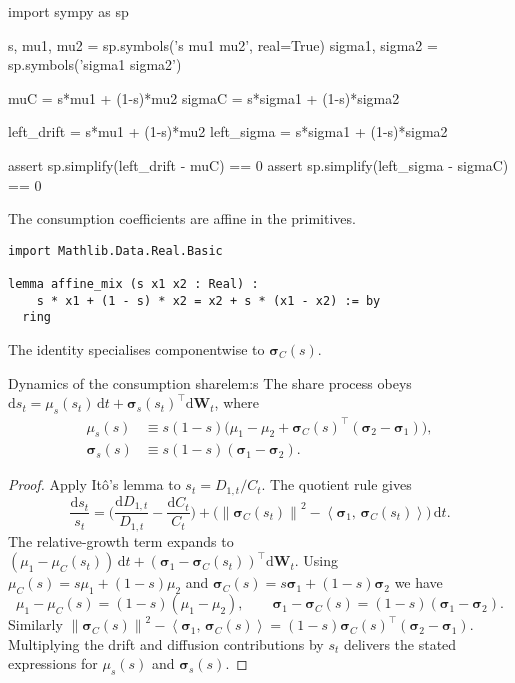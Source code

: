 ﻿\documentclass[11pt,letterpaper,oneside]{article}
\numberwithin{equation}{section}
\newcommand{\1}{\mathbf{1}}
\newcommand{\diff}{\mathrm{d}}
\newcommand{\norm}[1]{\left\lVert #1\right\rVert}
\newcommand{\ip}[2]{\left\langle #1,\,#2\right\rangle}
\begin{document}
\begin{sympycheck}[title={Verification: Consumption dynamics}]
\begin{pyconsole}
import sympy as sp

s, mu1, mu2 = sp.symbols('s mu1 mu2', real=True)
sigma1, sigma2 = sp.symbols('sigma1 sigma2')

muC = s*mu1 + (1-s)*mu2
sigmaC = s*sigma1 + (1-s)*sigma2

left_drift = s*mu1 + (1-s)*mu2
left_sigma = s*sigma1 + (1-s)*sigma2

assert sp.simplify(left_drift - muC) == 0
assert sp.simplify(left_sigma - sigmaC) == 0
\end{pyconsole}
\end{sympycheck}

\begin{leanproof}[title={Affine structure of $\mu_C$ and $\bm{\sigma}_C$}]
The consumption coefficients are affine in the primitives.
\begin{lstlisting}[basicstyle=\ttfamily\small]
import Mathlib.Data.Real.Basic

lemma affine_mix (s x1 x2 : Real) :
    s * x1 + (1 - s) * x2 = x2 + s * (x1 - x2) := by
  ring
\end{lstlisting}
The identity specialises componentwise to $\bm{\sigma}_C(s)$.
\end{leanproof}

\begin{lemma}{Dynamics of the consumption share}{lem:s}
The share process obeys $\diff s_t = \mu_s(s_t)\,\diff t + \bm{\sigma}_s(s_t)^{\top}\diff\bm{W}_t$, where
\begin{align}
  \mu_s(s) &\equiv s(1-s)\Big(\mu_1-\mu_2+\bm{\sigma}_C(s)^{\top}(\bm{\sigma}_2-\bm{\sigma}_1)\Big), \\
  \bm{\sigma}_s(s) &\equiv s(1-s)(\bm{\sigma}_1-\bm{\sigma}_2).
  \label{eq:s_drift}
\end{align}
\end{lemma}
\begin{proof}
Apply It\^o's lemma to $s_t = D_{1,t}/C_t$. The quotient rule gives
\[
  \frac{\diff s_t}{s_t} = \Big(\frac{\diff D_{1,t}}{D_{1,t}}-\frac{\diff C_t}{C_t}\Big) + \Big(\norm{\bm{\sigma}_C(s_t)}^2 - \ip{\bm{\sigma}_1}{\bm{\sigma}_C(s_t)}\Big)\,\diff t.
\]
The relative-growth term expands to $(\mu_1-\mu_C(s_t))\,\diff t + (\bm{\sigma}_1-\bm{\sigma}_C(s_t))^{\top}\diff\bm{W}_t$. Using $\mu_C(s) = s\mu_1 + (1-s)\mu_2$ and $\bm{\sigma}_C(s) = s\bm{\sigma}_1 + (1-s)\bm{\sigma}_2$ we have
\[
  \mu_1-\mu_C(s) = (1-s)(\mu_1-\mu_2),
  \qquad
  \bm{\sigma}_1-\bm{\sigma}_C(s) = (1-s)(\bm{\sigma}_1-\bm{\sigma}_2).
\]
Similarly $\norm{\bm{\sigma}_C(s)}^2 - \ip{\bm{\sigma}_1}{\bm{\sigma}_C(s)} = (1-s)\bm{\sigma}_C(s)^{\top}(\bm{\sigma}_2-\bm{\sigma}_1)$. Multiplying the drift and diffusion contributions by $s_t$ delivers the stated expressions for $\mu_s(s)$ and $\bm{\sigma}_s(s)$.
\end{proof}
\end{document}
